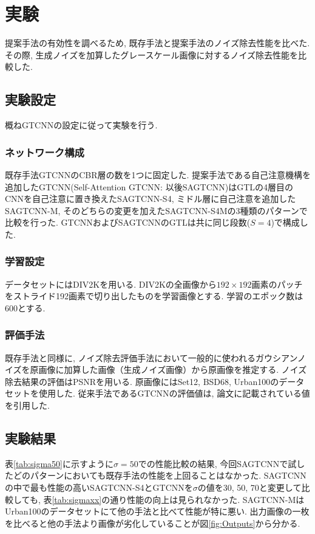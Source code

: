 \chapter{実験}
提案手法の有効性を調べるため, 既存手法と提案手法のノイズ除去性能を比べた. その際, 生成ノイズを加算したグレースケール画像に対するノイズ除去性能を比較した.

\section{実験設定}
概ねGTCNNの設定に従って実験を行う\cite{GTCNN}.

\subsection{ネットワーク構成}
既存手法GTCNNのCBR層の数を1つに固定した. 提案手法である自己注意機構を追加したGTCNN(Self-Attention GTCNN: 以後SAGTCNN)はGTLの4層目のCNNを自己注意に置き換えたSAGTCNN-S4, ミドル層に自己注意を追加したSAGTCNN-M, そのどちらの変更を加えたSAGTCNN-S4Mの3種類のパターンで比較を行った. GTCNNおよびSAGTCNNのGTLは共に同じ段数($S=4$)で構成した.

\subsection{学習設定}
データセットにはDIV2Kを用いる. DIV2Kの全画像から$192 \times 192$画素のパッチをストライド192画素で切り出したものを学習画像とする. 学習のエポック数は600とする.

\subsection{評価手法}
既存手法と同様に, ノイズ除去評価手法において一般的に使われるガウシアンノイズを原画像に加算した画像（生成ノイズ画像）から原画像を推定する. ノイズ除去結果の評価はPSNRを用いる. 原画像にはSet12, BSD68, Urban100のデータセットを使用した. 従来手法であるGTCNNの評価値は, 論文に記載されている値を引用した.

\section{実験結果}
表\ref{tab:sigma50}に示すように$\sigma=50$での性能比較の結果, 今回SAGTCNNで試したどのパターンにおいても既存手法の性能を上回ることはなかった. SAGTCNNの中で最も性能の高いSAGTCNN-S4とGTCNNを$\sigma$の値を30, 50, 70と変更して比較しても, 表\ref{tab:sigmaxx}の通り性能の向上は見られなかった. SAGTCNN-MはUrban100のデータセットにて他の手法と比べて性能が特に悪い. 出力画像の一枚を比べると他の手法より画像が劣化していることが図\ref{fig:Outputs}から分かる. 

